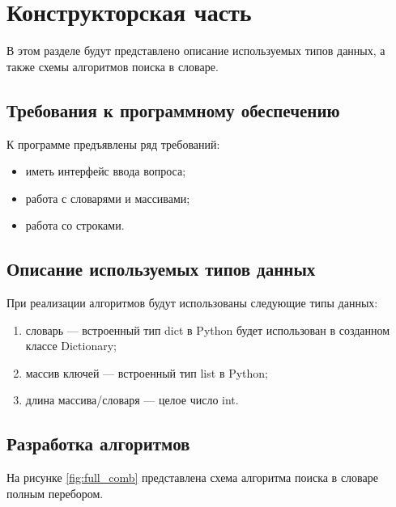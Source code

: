 \chapter{Конструкторская часть}
В этом разделе будут представлено описание используемых типов данных, а также схемы алгоритмов поиска в словаре.

\section{Требования к программному обеспечению}

К программе предъявлены ряд требований:

\begin{itemize}[label=---]
	\item иметь интерфейс ввода вопроса;
	\item работа с словарями и массивами;
	\item работа со строками.
\end{itemize}

\section{Описание используемых типов данных}
При реализации алгоритмов будут использованы следующие типы данных:
\begin{enumerate}[label=\arabic*)]
	\item словарь --- встроенный тип dict \cite{pythondict} в Python\cite{pythonlang} будет использован в созданном классе Dictionary;
	\item массив ключей --- встроенный тип list \cite{pythonlist} в Python\cite{pythonlang};
	\item длина массива/словаря --- целое число int.
\end{enumerate}

\section{Разработка алгоритмов}

На рисунке \ref{fig:full_comb} представлена схема алгоритма поиска в словаре полным перебором.

